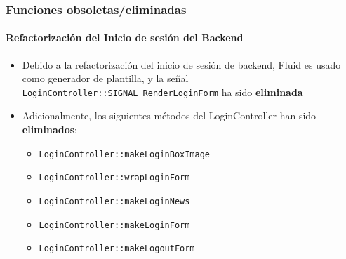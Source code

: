\begin{frame}[fragile]
	\frametitle{Funciones obsoletas/eliminadas}
	\framesubtitle{Refactorización del Inicio de sesión del Backend}

	\begin{itemize}

		\item Debido a la refactorización del inicio de sesión de backend, 
			Fluid es usado como generador de plantilla, y la señal 
			\small\texttt{LoginController::SIGNAL\_RenderLoginForm}\normalsize\space
			ha sido \textbf{eliminada}

		\item Adicionalmente, los siguientes métodos del LoginController han sido \textbf{eliminados}:

			\begin{itemize}
				\item \texttt{LoginController::makeLoginBoxImage}
				\item \texttt{LoginController::wrapLoginForm}
				\item \texttt{LoginController::makeLoginNews}
				\item \texttt{LoginController::makeLoginForm}
				\item \texttt{LoginController::makeLogoutForm}
			\end{itemize}

	\end{itemize}

\end{frame}


